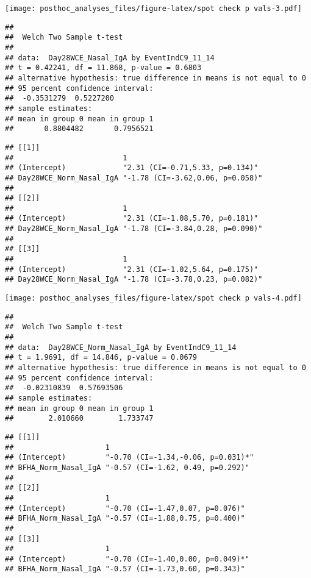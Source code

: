 \documentclass[
]{article}
\begin{document}
\texttt{[image: posthoc\_analyses\_files/figure-latex/spot check p vals-3.pdf]}

\begin{verbatim}
## 
##  Welch Two Sample t-test
## 
## data:  Day28WCE_Nasal_IgA by EventIndC9_11_14
## t = 0.42241, df = 11.868, p-value = 0.6803
## alternative hypothesis: true difference in means is not equal to 0
## 95 percent confidence interval:
##  -0.3531279  0.5227200
## sample estimates:
## mean in group 0 mean in group 1 
##       0.8804482       0.7956521
\end{verbatim}

\begin{verbatim}
## [[1]]
##                         1                               
## (Intercept)             "2.31 (CI=-0.71,5.33, p=0.134)" 
## Day28WCE_Norm_Nasal_IgA "-1.78 (CI=-3.62,0.06, p=0.058)"
## 
## [[2]]
##                         1                               
## (Intercept)             "2.31 (CI=-1.08,5.70, p=0.181)" 
## Day28WCE_Norm_Nasal_IgA "-1.78 (CI=-3.84,0.28, p=0.090)"
## 
## [[3]]
##                         1                               
## (Intercept)             "2.31 (CI=-1.02,5.64, p=0.175)" 
## Day28WCE_Norm_Nasal_IgA "-1.78 (CI=-3.78,0.23, p=0.082)"
\end{verbatim}

\texttt{[image: posthoc\_analyses\_files/figure-latex/spot check p vals-4.pdf]}

\begin{verbatim}
## 
##  Welch Two Sample t-test
## 
## data:  Day28WCE_Norm_Nasal_IgA by EventIndC9_11_14
## t = 1.9691, df = 14.846, p-value = 0.0679
## alternative hypothesis: true difference in means is not equal to 0
## 95 percent confidence interval:
##  -0.02310839  0.57693506
## sample estimates:
## mean in group 0 mean in group 1 
##        2.010660        1.733747
\end{verbatim}

\begin{verbatim}
## [[1]]
##                     1                                 
## (Intercept)         "-0.70 (CI=-1.34,-0.06, p=0.031)*"
## BFHA_Norm_Nasal_IgA "-0.57 (CI=-1.62, 0.49, p=0.292)" 
## 
## [[2]]
##                     1                               
## (Intercept)         "-0.70 (CI=-1.47,0.07, p=0.076)"
## BFHA_Norm_Nasal_IgA "-0.57 (CI=-1.88,0.75, p=0.400)"
## 
## [[3]]
##                     1                                
## (Intercept)         "-0.70 (CI=-1.40,0.00, p=0.049)*"
## BFHA_Norm_Nasal_IgA "-0.57 (CI=-1.73,0.60, p=0.343)"
\end{verbatim}
\end{document}
